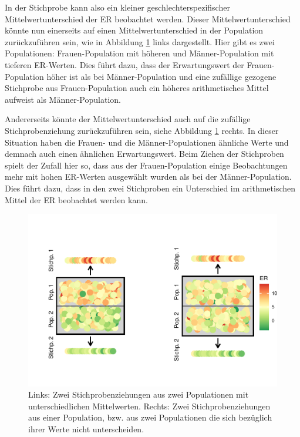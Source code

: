 \documentclass[
]{book}
\theoremstyle{definition}
\theoremstyle{definition}
\theoremstyle{definition}
\theoremstyle{definition}
\theoremstyle{remark}
\begin{document}
In der Stichprobe kann also ein kleiner geschlechterspezifischer Mittelwertunterschied der ER beobachtet werden. Dieser Mittelwertunterschied könnte nun einerseits auf einen Mittelwertunterschied in der Population zurückzuführen sein, wie in Abbildung \ref{fig:exm-breakup-bagplot} links dargestellt. Hier gibt es zwei Populationen: Frauen-Population mit höheren und Männer-Population mit tieferen ER-Werten. Dies führt dazu, dass der Erwartungswert der Frauen-Population höher ist als bei Männer-Population und eine zufällige gezogene Stichprobe aus Frauen-Population auch ein höheres arithmetisches Mittel aufweist als Männer-Population.

Andererseits könnte der Mittelwertunterschied auch auf die zufällige Stichprobenziehung zurückzuführen sein, siehe Abbildung \ref{fig:exm-breakup-bagplot} rechts. In dieser Situation haben die Frauen- und die Männer-Populationen ähnliche Werte und demnach auch einen ähnlichen Erwartungswert. Beim Ziehen der Stichproben spielt der Zufall hier so, dass aus der Frauen-Population einige Beobachtungen mehr mit hohen ER-Werten ausgewählt wurden als bei der Männer-Population. Dies führt dazu, dass in den zwei Stichproben ein Unterschied im arithmetischen Mittel der ER beobachtet werden kann.

\begin{figure}

{\centering \includegraphics{aps_statistik1_files/figure-latex/exm-breakup-bagplot-1} 

}

\caption{Links: Zwei Stichprobenziehungen aus zwei Populationen mit unterschiedlichen Mittelwerten. Rechts: Zwei Stichprobenziehungen aus einer Population, bzw. aus zwei Populationen die sich bezüglich ihrer Werte nicht unterscheiden.}\label{fig:exm-breakup-bagplot}
\end{figure}
\end{document}
